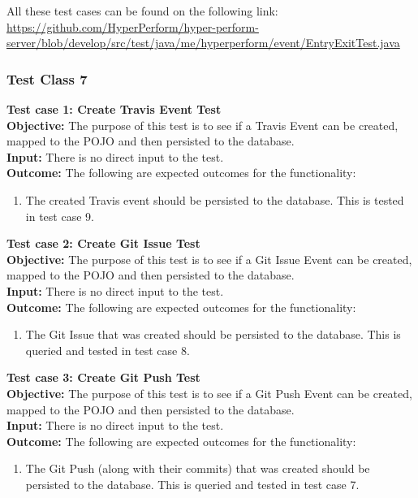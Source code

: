 \documentclass[11pt,a4paper]{article}
\begin{document}
All these test cases can be found on the following link:
\url{https://github.com/HyperPerform/hyper-perform-server/blob/develop/src/test/java/me/hyperperform/event/EntryExitTest.java}

\subsubsection{Test Class 7}	
\textbf{Test case 1: Create Travis Event Test} \\
\textbf{Objective: } The purpose of this test is to see if a Travis Event can be created, mapped to the POJO and then persisted to the database. \\
\textbf{Input: } There is no direct input to the test. \\
\textbf{Outcome: } The following are expected outcomes for the functionality: 
\begin{enumerate}
	\item The created Travis event should be persisted to the database. This is tested in test case 9.\\
\end{enumerate}
\noindent
\textbf{Test case 2: Create Git Issue Test} \\
\textbf{Objective: } The purpose of this test is to see if a Git Issue Event can be created, mapped to the POJO and then persisted to the database. \\
\textbf{Input: } There is no direct input to the test. \\
\textbf{Outcome: } The following are expected outcomes for the functionality: 
\begin{enumerate}
	\item The Git Issue that was created should be persisted to the database. This is queried and tested in test case 8.\\
\end{enumerate}
\noindent
\textbf{Test case 3: Create Git Push Test} \\
\textbf{Objective: } The purpose of this test is to see if a Git Push Event can be created, mapped to the POJO and then persisted to the database. \\
\textbf{Input: } There is no direct input to the test. \\
\textbf{Outcome: } The following are expected outcomes for the functionality: 
\begin{enumerate}
	\item The Git Push (along with their commits) that was created should be persisted to the database. This is queried and tested in test case 7.\\
\end{enumerate}
\end{document}
